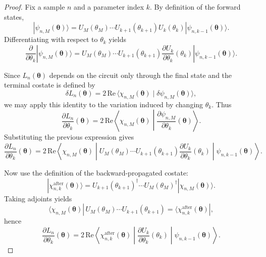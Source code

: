 \documentclass[aps,prb,10pt,twocolumn,superscriptaddress]{revtex4-2}
\begin{document}
\begin{proof}
Fix a sample \(n\) and a parameter index \(k\).
By definition of the forward states,
\[
|\psi_{n,M}(\bm{\theta})\rangle
=
U_M(\theta_M)\cdots U_{k+1}(\theta_{k+1})
U_k(\theta_k)
|\psi_{n,k-1}(\bm{\theta})\rangle.
\]
Differentiating with respect to \(\theta_k\) yields
\[
\frac{\partial}{\partial \theta_k}|\psi_{n,M}(\bm{\theta})\rangle
=
U_M(\theta_M)\cdots U_{k+1}(\theta_{k+1})
\frac{\partial U_k}{\partial \theta_k}(\theta_k)
|\psi_{n,k-1}(\bm{\theta})\rangle.
\]

Since \(L_n(\bm{\theta})\) depends on the circuit only through the final state and the terminal
costate is defined by
\[
\delta L_n(\bm{\theta})
=
2\,\mathrm{Re}\,\langle \chi_{n,M}(\bm{\theta})\mid \delta\psi_{n,M}(\bm{\theta})\rangle,
\]
we may apply this identity to the variation induced by changing \(\theta_k\). Thus
\[
\frac{\partial L_n}{\partial \theta_k}(\bm{\theta})
=
2\,\mathrm{Re}\!\left\langle
\chi_{n,M}(\bm{\theta})
\middle|
\frac{\partial \psi_{n,M}}{\partial \theta_k}(\bm{\theta})
\right\rangle.
\]
Substituting the previous expression gives
\[
\frac{\partial L_n}{\partial \theta_k}(\bm{\theta})
=
2\,\mathrm{Re}\!\left\langle
\chi_{n,M}(\bm{\theta})
\middle|
U_M(\theta_M)\cdots U_{k+1}(\theta_{k+1})
\frac{\partial U_k}{\partial \theta_k}(\theta_k)
\middle|
\psi_{n,k-1}(\bm{\theta})
\right\rangle.
\]

Now use the definition of the backward-propagated costate:
\[
|\chi_{n,k}^{\mathrm{after}}(\bm{\theta})\rangle
=
U_{k+1}(\theta_{k+1})^\dagger\cdots U_M(\theta_M)^\dagger
|\chi_{n,M}(\bm{\theta})\rangle.
\]
Taking adjoints yields
\[
\langle \chi_{n,M}(\bm{\theta})|
\,U_M(\theta_M)\cdots U_{k+1}(\theta_{k+1})
=
\langle \chi_{n,k}^{\mathrm{after}}(\bm{\theta})|,
\]
hence
\[
\frac{\partial L_n}{\partial \theta_k}(\bm{\theta})
=
2\,\mathrm{Re}\!\left\langle
\chi_{n,k}^{\mathrm{after}}(\bm{\theta})
\middle|
\frac{\partial U_k}{\partial \theta_k}(\theta_k)
\middle|
\psi_{n,k-1}(\bm{\theta})
\right\rangle.
\]


\end{proof}
\end{document}
